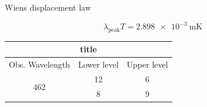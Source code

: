Wiens displacement law

\begin{equation}
    \lambda_{\text{peak}}T = \SI{2.898e-3}{\meter\kelvin} \label{eq:wien}
\end{equation}

\begin{table}
	\begin{tabular}[h]{ccc}
		\toprule
		\multicolumn{3}{c}{title}\\
		\midrule
		Obs. Wavelength & Lower level & Upper level  \\
		\multirow{2}{*}{462} & 12  & 6 \\
		 & 8 & 9 \\
		\bottomrule
	\end{tabular}
\end{table}
